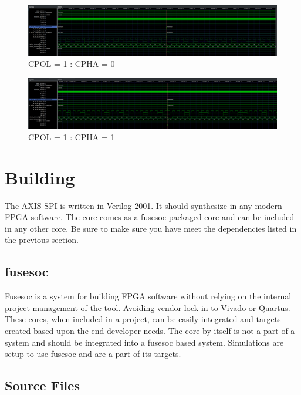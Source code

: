 \begin{figure}[H]
\caption{CPOL = 1 : CPHA = 0}
\centering
\includegraphics[width=\textwidth]{img/diagrams/waveform_10_spaced.png}
\end{figure}

\begin{figure}[H]
\caption{CPOL = 1 : CPHA = 1}
\centering
\includegraphics[width=\textwidth]{img/diagrams/waveform_11_spaced.png}
\end{figure}

\section{Building}

\par
The AXIS SPI is written in Verilog 2001. It should synthesize in any modern FPGA software. The core comes as a fusesoc packaged core and can be
included in any other core. Be sure to make sure you have meet the dependencies listed in the previous section.

\subsection{fusesoc}
\par
Fusesoc is a system for building FPGA software without relying on the internal project management of the tool. Avoiding vendor lock in to Vivado or Quartus.
These cores, when included in a project, can be easily integrated and targets created based upon the end developer needs. The core by itself is not a part of
a system and should be integrated into a fusesoc based system. Simulations are setup to use fusesoc and are a part of its targets.

\subsection{Source Files}

